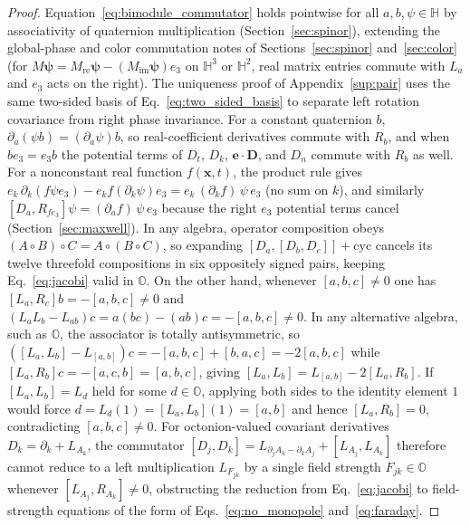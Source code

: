 \documentclass[aps,prd,onecolumn,tightenlines,nofootinbib,notitlepage,11pt,floatfix]{revtex4-2}
\theoremstyle{indentedtheorem}
\begin{document}
\begin{proof}
Equation~\eqref{eq:bimodule_commutator} holds pointwise for all $a,b,\psi\in\mathbb{H}$ by associativity of quaternion multiplication (Section~\ref{sec:spinor}), extending the global-phase and color commutation notes of Sections~\ref{sec:spinor} and~\ref{sec:color} (for $M\boldsymbol{\psi}=M_\text{re}\boldsymbol{\psi}-(M_\text{im}\boldsymbol{\psi})e_3$ on $\mathbb{H}^3$ or $\mathbb{H}^2$, real matrix entries commute with $L_a$ and $e_3$ acts on the right). The uniqueness proof of Appendix~\ref{sup:pair} uses the same two-sided basis of Eq.~\eqref{eq:two_sided_basis} to separate left rotation covariance from right phase invariance. For a constant quaternion $b$, $\partial_a(\psi b) = (\partial_a\psi)b$, so real-coefficient derivatives commute with $R_b$, and when $b e_3 = e_3 b$ the potential terms of $D_t$, $D_k$, $\mathbf{e}\cdot\mathbf{D}$, and $D_n$ commute with $R_b$ as well. For a nonconstant real function $f(\mathbf{x},t)$, the product rule gives $e_k\,\partial_k(f\psi e_3) - e_k f(\partial_k\psi)e_3 = e_k\,(\partial_k f)\,\psi\,e_3$ (no sum on $k$), and similarly $[D_a, R_{f e_3}]\psi = (\partial_a f)\,\psi\,e_3$ because the right $e_3$ potential terms cancel (Section~\ref{sec:maxwell}). In any algebra, operator composition obeys $(A\circ B)\circ C = A\circ(B\circ C)$, so expanding $[D_a,[D_b,D_c]]+\text{cyc}$ cancels its twelve threefold compositions in six oppositely signed pairs, keeping Eq.~\eqref{eq:jacobi} valid in $\mathbb{O}$. On the other hand, whenever $[a,b,c]\neq 0$ one has $[L_a, R_c]b = -[a,b,c]\neq 0$ and $(L_a L_b - L_{ab})c = a(bc) - (ab)c = -[a,b,c]\neq 0$. In any alternative algebra, such as $\mathbb{O}$, the associator is totally antisymmetric, so $([L_a,L_b] - L_{[a,b]})c = -[a,b,c] + [b,a,c] = -2[a,b,c]$ while $[L_a,R_b]c = -[a,c,b] = [a,b,c]$, giving $[L_a,L_b] = L_{[a,b]} - 2[L_a,R_b]$. If $[L_a,L_b] = L_d$ held for some $d\in\mathbb{O}$, applying both sides to the identity element $1$ would force $d = L_d(1) = [L_a,L_b](1) = [a,b]$ and hence $[L_a,R_b] = 0$, contradicting $[a,b,c]\neq 0$. For octonion-valued covariant derivatives $D_k = \partial_k + L_{A_k}$, the commutator $[D_j,D_k] = L_{\partial_j A_k - \partial_k A_j} + [L_{A_j}, L_{A_k}]$ therefore cannot reduce to a left multiplication $L_{F_{jk}}$ by a single field strength $F_{jk}\in\mathbb{O}$ whenever $[L_{A_j},R_{A_k}]\neq 0$, obstructing the reduction from Eq.~\eqref{eq:jacobi} to field-strength equations of the form of Eqs.~\eqref{eq:no_monopole} and~\eqref{eq:faraday}.
\end{proof}
\end{document}
